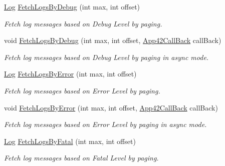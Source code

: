 \begin{DoxyCompactItemize}
\hyperlink{classcom_1_1shephertz_1_1app42_1_1paas_1_1sdk_1_1csharp_1_1log_1_1_log}{Log} \hyperlink{classcom_1_1shephertz_1_1app42_1_1paas_1_1sdk_1_1csharp_1_1log_1_1_log_service_af0728ece6315e2dfde3a7955512236be}{Fetch\+Logs\+By\+Debug} (int max, int offset)
\begin{DoxyCompactList}\small\item\em Fetch log messages based on Debug Level by paging. \end{DoxyCompactList}\item 
void \hyperlink{classcom_1_1shephertz_1_1app42_1_1paas_1_1sdk_1_1csharp_1_1log_1_1_log_service_a78d3e3ac12ee858a00276216bc1bd156}{Fetch\+Logs\+By\+Debug} (int max, int offset, \hyperlink{interfacecom_1_1shephertz_1_1app42_1_1paas_1_1sdk_1_1csharp_1_1_app42_call_back}{App42\+Call\+Back} call\+Back)
\begin{DoxyCompactList}\small\item\em Fetch log messages based on Debug Level by paging in async mode. \end{DoxyCompactList}\item 
\hyperlink{classcom_1_1shephertz_1_1app42_1_1paas_1_1sdk_1_1csharp_1_1log_1_1_log}{Log} \hyperlink{classcom_1_1shephertz_1_1app42_1_1paas_1_1sdk_1_1csharp_1_1log_1_1_log_service_a4538247790590aa76a3fca7efb3b2ad5}{Fetch\+Logs\+By\+Error} (int max, int offset)
\begin{DoxyCompactList}\small\item\em Fetch log messages based on Error Level by paging. \end{DoxyCompactList}\item 
void \hyperlink{classcom_1_1shephertz_1_1app42_1_1paas_1_1sdk_1_1csharp_1_1log_1_1_log_service_aab90aadfe013ac4cdd4e78c81e5a3c7c}{Fetch\+Logs\+By\+Error} (int max, int offset, \hyperlink{interfacecom_1_1shephertz_1_1app42_1_1paas_1_1sdk_1_1csharp_1_1_app42_call_back}{App42\+Call\+Back} call\+Back)
\begin{DoxyCompactList}\small\item\em Fetch log messages based on Error Level by paging in async mode. \end{DoxyCompactList}\item 
\hyperlink{classcom_1_1shephertz_1_1app42_1_1paas_1_1sdk_1_1csharp_1_1log_1_1_log}{Log} \hyperlink{classcom_1_1shephertz_1_1app42_1_1paas_1_1sdk_1_1csharp_1_1log_1_1_log_service_a3b7baf3266ecb6ed98c4802915722b52}{Fetch\+Logs\+By\+Fatal} (int max, int offset)
\begin{DoxyCompactList}\small\item\em Fetch log messages based on Fatal Level by paging. \end{DoxyCompactList}\item 

\end{DoxyCompactItemize}
